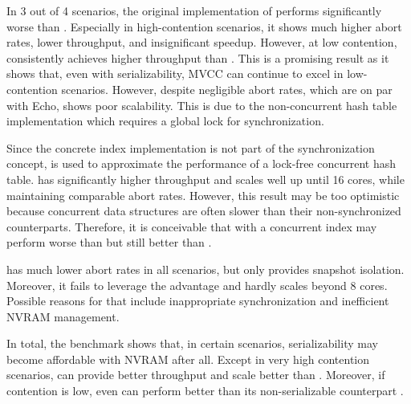 
In 3 out of 4 scenarios, the original implementation of \midas performs
significantly worse than \echo. Especially in high-contention scenarios, it
shows much higher abort rates, lower throughput, and insignificant speedup.
However, at low contention, \midas consistently achieves higher throughput than
\echo. This is a promising result as it shows that, even with serializability,
MVCC can continue to excel in low-contention scenarios. However, despite
negligible abort rates, which are on par with Echo, \midas shows poor
scalability. This is due to the non-concurrent hash table implementation which
requires a global lock for synchronization.

Since the concrete index implementation is not part of the synchronization
concept, \midasopt is used to approximate the performance of a lock-free
concurrent hash table. \midasopt has significantly higher throughput and scales
well up until 16 cores, while maintaining comparable abort rates. However, this
result may be too optimistic because concurrent data structures are often slower
than their non-synchronized counterparts. Therefore, it is conceivable that
\midas with a concurrent index may perform worse than \midasopt but still better
than \echo.

\echo has much lower abort rates in all scenarios, but only provides snapshot
isolation. Moreover, it fails to leverage the advantage and hardly scales beyond
8 cores. Possible reasons for that include inappropriate synchronization and
inefficient NVRAM management.

In total, the benchmark shows that, in certain scenarios, serializability may
become affordable with NVRAM after all. Except in very high contention
scenarios, \midasopt can provide better throughput and scale better than \echo.
Moreover, if contention is low, even \midas can perform better than its
non-serializable counterpart \echo.
